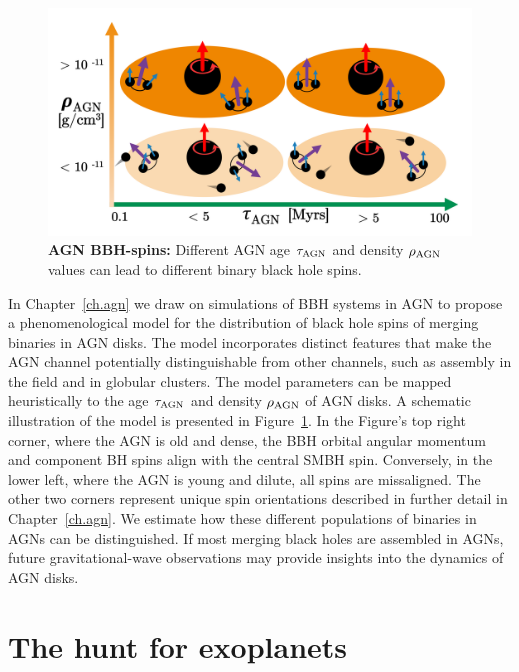 \begin{figure}
\begin{center}
  \centerline{\includegraphics[width=1.\linewidth]{src/figures/agn_spins.png}}
  \caption{\textbf{AGN BBH-spins:} Different AGN age $\tau_{\rm AGN}$ and density $\rho_{\rm AGN}$ values can lead to different binary black hole spins. }
  \label{fig:agn_spins}
\end{center}
\end{figure}


In Chapter~\ref{ch.agn} we draw on simulations of BBH systems in AGN to propose a phenomenological model for the distribution of black hole spins of merging binaries in AGN disks. 
The model incorporates distinct features that make the AGN channel potentially distinguishable from other channels, such as assembly in the field and in globular clusters. 
The model parameters can be mapped heuristically to the age $\tau_{\rm AGN}$ and density $\rho_{\rm AGN}$ of AGN disks. 
A schematic illustration of the model is presented in Figure~\ref{fig:agn_spins}. 
In the Figure's top right corner, where the AGN is old and dense, the BBH orbital angular momentum and component BH spins align with the central SMBH spin. 
Conversely, in the lower left, where the AGN is young and dilute, all spins are missaligned. The other two corners represent unique spin orientations described in further detail in Chapter~\ref{ch.agn}.
We estimate how these different populations of binaries in AGNs can be distinguished.
If most merging black holes are assembled in AGNs, future gravitational-wave observations may provide insights into the dynamics of AGN disks.

\section{The hunt for exoplanets}

